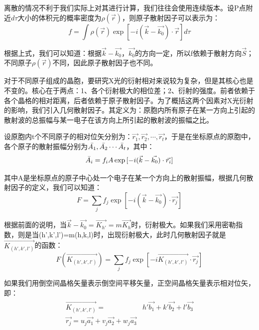 \documentclass{ctexart}
\begin{document}
        离散的情况不利于我们实际上对其进行计算，我们往往会使用连续版本。设P点附近$d\tau$大小的体积元的概率密度为$\rho(\vec{r})$，则原子散射因子可以表示为：
        \begin{equation}
            f=\int \rho(\vec{r})\exp{[-i(\vec{k}-\vec{k_0})\cdot \vec{r}]}d\tau
        \end{equation}
        
        根据上式，我们可以知道：根据$\vec{k}-\vec{k_0}$，$\vec{k_0}$的方向一定，所以f依赖于散射方向$\vec{S}$；不同原子$\rho(\vec{r})$不同，因此原子散射因子也不同。
        
        对于不同原子组成的晶胞，要研究X光的衍射相对来说较为复杂，但是其核心也是不变的。核心在于两点：1、各个衍射极大的相位差；2、衍射的强度。前者依赖于各个晶格的相对距离，后者依赖于原子散射因子。为了概括这两个因素对X光衍射的影响，我们引入几何散射因子。其定义为：原胞内所有原子在某一方向上引起的散射波的总振幅与某一电子在该方向上所引起的散射波的振幅之比。
        
        设原胞内t个不同原子的相对位矢分别为：$\vec{r_1},\vec{r_2},\cdots,\vec{r_t}$，于是在坐标原点的原胞中，各个原子的散射振幅分别为$\Bar{A_1},\Bar{A_2}\cdots\Bar{A_t}$，其中：
        \begin{equation}
            \Bar{A_i}=f_iA\exp{[-i(\vec{k}-\vec{k_0})\cdot \vec{r_i}]}
        \end{equation}
        
        其中A是坐标原点的原子中心处一个电子在某一个方向上的散射振幅，根据几何散射因子的定义，我们可以知道：
        \begin{equation}
            F=\sum_j f_j \exp{[-i(\vec{k}-\vec{k_0})\cdot \vec{r_j}]}
        \end{equation}
        
        根据前面的说明，当$\vec{k}-\vec{k_0}=\vec{K_{h'}}=m\vec{K_h}$时，衍射极大。如果我们采用密勒指数，则是当(h',k',l')=m(h,k,l)时，出现衍射极大，此时几何散射因子就是$\vec{K_{(h',k',l')}}$的函数：
        \begin{equation}\label{equ:3geometricdiffractionfactor}
            F(\vec{K_{(h',k',l')}})=\sum_j f_j \exp{[-i\vec{K_{(h',k',l')}}\cdot \vec{r_j}]}
        \end{equation}
        
        如果我们用倒空间晶格矢量表示倒空间平移矢量，正空间晶格矢量表示相对位矢，即：
        \begin{align}
            \begin{split}
                \vec{K_{(h',k',l')}}=& h'\vec{b_1}+k'\vec{b_2}+l'\vec{b_3}\\
                \vec{r_j}=u_j\vec{a_1}+v_j\vec{a_2}+w_j\vec{a_3}
            \end{split}
        \end{align}
\end{document}
